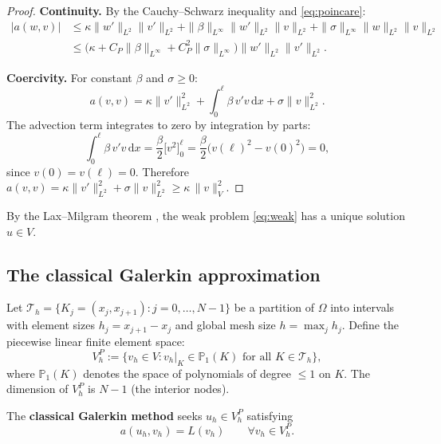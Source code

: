 \documentclass[11pt]{article}
\newcommand{\Th}{\mathcal{T}_h}
\newcommand{\Vp}{V_h^P}
\newcommand{\dom}{\Omega}
\newcommand{\dd}{\,\mathrm{d}}
\theoremstyle{remark}
\begin{document}
\begin{proof}
\textbf{Continuity.} By the Cauchy--Schwarz inequality and \eqref{eq:poincare}:
\begin{align}
|a(w,v)| &\leq \kappa\|w'\|_{L^2}\|v'\|_{L^2} + \|\beta\|_{L^\infty}\|w'\|_{L^2}\|v\|_{L^2} + \|\sigma\|_{L^\infty}\|w\|_{L^2}\|v\|_{L^2}\\
&\leq \bigl(\kappa + C_P\|\beta\|_{L^\infty} + C_P^2\|\sigma\|_{L^\infty}\bigr)\|w'\|_{L^2}\|v'\|_{L^2}.
\end{align}

\textbf{Coercivity.} For constant $\beta$ and $\sigma \geq 0$:
\begin{equation}
a(v,v) = \kappa\|v'\|_{L^2}^2 + \int_0^\ell \beta\,v'v\dd x + \sigma\|v\|_{L^2}^2.
\end{equation}
The advection term integrates to zero by integration by parts:
\begin{equation}
\int_0^\ell \beta\,v'v\dd x = \frac{\beta}{2}\bigl[v^2\bigr]_0^\ell = \frac{\beta}{2}\bigl(v(\ell)^2 - v(0)^2\bigr) = 0,
\end{equation}
since $v(0) = v(\ell) = 0$. Therefore $a(v,v) = \kappa\|v'\|_{L^2}^2 + \sigma\|v\|_{L^2}^2 \geq \kappa\,\|v\|_V^2$.
\end{proof}

By the Lax--Milgram theorem \cite{brezis2010functional}, the weak problem \eqref{eq:weak} has a unique solution $u \in V$.

\subsection{The classical Galerkin approximation}

Let $\Th = \{K_j = (x_j, x_{j+1}) : j = 0,\ldots,N-1\}$ be a partition of $\dom$ into intervals with element sizes $h_j = x_{j+1} - x_j$ and global mesh size $h = \max_j h_j$. Define the piecewise linear finite element space:
\begin{equation}\label{eq:VhP}
\Vp := \bigl\{v_h \in V : v_h\big|_K \in \mathbb{P}_1(K) \text{ for all } K \in \Th\bigr\},
\end{equation}
where $\mathbb{P}_1(K)$ denotes the space of polynomials of degree $\leq 1$ on $K$. The dimension of $\Vp$ is $N-1$ (the interior nodes).

The \textbf{classical Galerkin method} seeks $u_h \in \Vp$ satisfying
\begin{equation}\label{eq:Galerkin}
a(u_h, v_h) = L(v_h) \qquad \forall v_h \in \Vp.
\end{equation}
\end{document}
